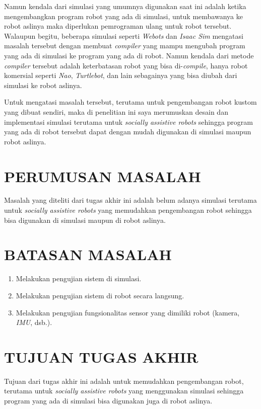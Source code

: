 Namun kendala dari simulasi yang umumnya digunakan saat ini adalah ketika mengembangkan program robot yang ada di simulasi, untuk membawanya ke robot aslinya maka diperlukan pemrograman ulang untuk robot tersebut.
Walaupun begitu, beberapa simulasi seperti \emph{Webots} dan \emph{Isaac Sim} mengatasi masalah tersebut dengan membuat \emph{compiler} yang mampu mengubah program yang ada di simulasi ke program yang ada di robot.
Namun kendala dari metode \emph{compiler} tersebut adalah keterbatasan robot yang bisa di-\emph{compile}, hanya robot komersial seperti \emph{Nao}, \emph{Turtlebot}, dan lain sebagainya yang bisa diubah dari simulasi ke robot aslinya.

Untuk mengatasi masalah tersebut, terutama untuk pengembangan robot kustom yang dibuat sendiri, maka di penelitian ini saya merumuskan desain dan implementasi simulasi terutama untuk \emph{socially assistive robots} sehingga program yang ada di robot tersebut dapat dengan mudah digunakan di simulasi maupun robot aslinya.

\section{PERUMUSAN MASALAH}

Masalah yang diteliti dari tugas akhir ini adalah belum adanya simulasi terutama untuk \emph{socially assistive robots} yang memudahkan pengembangan robot sehingga bisa digunakan di simulasi maupun di robot aslinya.

\section{BATASAN MASALAH}

\begin{enumerate}[nolistsep]
  \item Melakukan pengujian sistem di simulasi.
  \item Melakukan pengujian sistem di robot secara langsung.
  \item Melakukan pengujian fungsionalitas sensor yang dimiliki robot (kamera, \emph{IMU}, dsb.).
\end{enumerate}

\section{TUJUAN TUGAS AKHIR}

Tujuan dari tugas akhir ini adalah untuk memudahkan pengembangan robot, terutama untuk \emph{socially assistive robots} yang menggunakan simulasi sehingga program yang ada di simulasi bisa digunakan juga di robot aslinya.